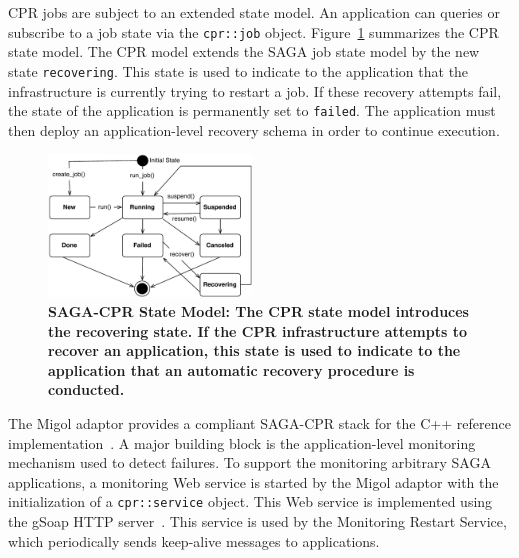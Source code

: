 \documentclass[times, 10pt, twocolumn]{article}
\begin{document}
CPR jobs are subject to an extended state model. An application can queries or subscribe to a job state via the \texttt{cpr::job} object.      
Figure~\ref{fig:cpr-statemodel} summarizes the CPR state model. The CPR model extends the SAGA job state model by the new state \texttt{recovering}. This state
is used to indicate to the application that the infrastructure is currently trying to restart a job. 
If these recovery attempts fail, the state of the application is permanently set to \texttt{failed}. 
The application must then deploy an application-level recovery schema in order to continue execution. 

\begin{figure}[th]
    \centering
        \includegraphics[width=0.48\textwidth]{cpr-statemodel.pdf}
    \caption{\small \bf SAGA-CPR State Model: The CPR state model introduces the recovering state. If the CPR infrastructure attempts to recover an application, this state is used to indicate to the application that an automatic recovery procedure is conducted.}
    \label{fig:cpr-statemodel}
\end{figure}
 

The Migol adaptor provides a compliant SAGA-CPR stack for the C++ reference implementation~\cite{Kaiser:2006qp}. 
A major building block is the application-level monitoring mechanism used to detect failures. 
To support the monitoring arbitrary SAGA applications, a monitoring Web service is started 
by the Migol adaptor with the initialization of a \texttt{cpr::service} object. This Web 
service is implemented using the gSoap HTTP server~\cite{gsoap}.  This service is used by the Monitoring Restart Service,
which periodically sends keep-alive messages to applications.                                                                             

\end{document}
